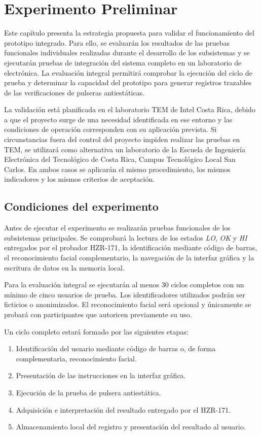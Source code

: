 \chapter{Experimento Preliminar}

Este capítulo presenta la estrategia propuesta para validar el funcionamiento del prototipo integrado. 
Para ello, se evaluarán los resultados de las pruebas funcionales individuales realizadas durante 
el desarrollo de los subsistemas y se ejecutarán pruebas de integración del sistema completo en un 
laboratorio de electrónica. La evaluación integral permitirá comprobar la ejecución del ciclo de 
prueba y determinar la capacidad del prototipo para generar registros 
trazables de las verificaciones de pulseras antiestáticas.

La validación está planificada en el laboratorio TEM de Intel Costa Rica, debido
a que el proyecto surge de una necesidad identificada en ese entorno y las
condiciones de operación corresponden con su aplicación prevista. Si
circunstancias fuera del control del proyecto impiden realizar las pruebas en
TEM, se utilizará como alternativa un laboratorio de la Escuela de Ingeniería
Electrónica del Tecnológico de Costa Rica, Campus Tecnológico Local San Carlos.
En ambos casos se aplicarán el mismo procedimiento, los mismos indicadores y los
mismos criterios de aceptación.

\section{Condiciones del experimento}

Antes de ejecutar el experimento se realizarán pruebas funcionales de los
subsistemas principales. Se comprobará la lectura de los estados
\textit{LO}, \textit{OK} y \textit{HI} entregados por el probador HZR-171, la
identificación mediante código de barras, el reconocimiento facial
complementario, la navegación de la interfaz gráfica y la escritura de datos en
la memoria local. 

Para la evaluación integral se ejecutarán al menos 30 ciclos completos con un
mínimo de cinco usuarios de prueba. Los identificadores utilizados podrán ser
ficticios o anonimizados. El reconocimiento facial será opcional y únicamente
se probará con participantes que autoricen previamente su uso.

Un ciclo completo estará formado por las siguientes etapas:

\begin{enumerate}
\item Identificación del usuario mediante código de barras o, de forma
complementaria, reconocimiento facial.
\item Presentación de las instrucciones en la interfaz gráfica.
\item Ejecución de la prueba de pulsera antiestática.
\item Adquisición e interpretación del resultado entregado por el HZR-171.
\item Almacenamiento local del registro y presentación del resultado al usuario.
\end{enumerate}

